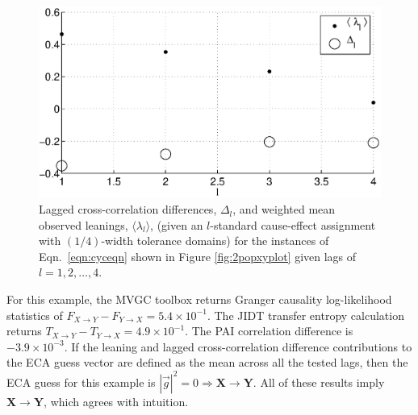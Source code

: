 \documentclass{article}[10pt]
\begin{document}
\begin{figure}[ht]
\begin{center}
\includegraphics[scale=0.7]{CoupLogMapExample_LandLCC.eps} 
\end{center}
\caption{Lagged cross-correlation differences, $\Delta_l$, and weighted mean observed leanings, $\langle\lambda_l\rangle$, (given an $l$-standard cause-effect assignment with $(1/4)$-width tolerance domains) for the instances of Eqn.\ \ref{eqn:cyceqn} shown in Figure \ref{fig:2popxyplot} given lags of $l=1,2,\ldots,4$.}
\label{fig:2popxyLandLCC}
\end{figure}

For this example, the MVGC toolbox returns Granger causality log-likelihood statistics of $F_{X\rightarrow Y}-F_{Y\rightarrow X}=5.4\times 10^{-1}$.  The JIDT transfer entropy calculation returns $T_{X\rightarrow Y}-T_{Y\rightarrow X}=4.9\times 10^{-1}$.  The PAI correlation difference is $-3.9\times 10^{-3}$.  If the leaning and lagged cross-correlation difference contributions to the ECA guess vector are defined as the mean across all the tested lags, then the ECA guess for this example is $|\vec{g}|^2=0\Rightarrow \mathbf{X}\rightarrow\mathbf{Y}$.  All of these results imply $\mathbf{X}\rightarrow\mathbf{Y}$, which agrees with intuition.   
\end{document}
